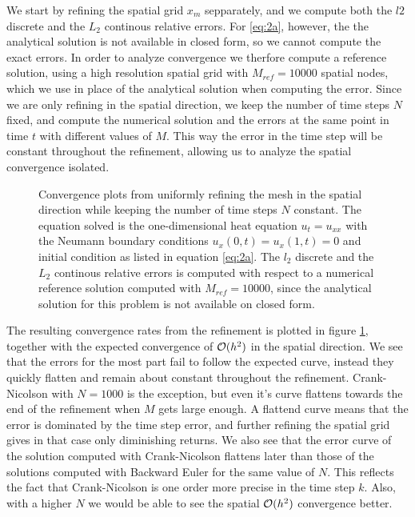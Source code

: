 We start by refining the spatial grid $x_m$ sepparately, 
and we compute both the $l2$ discrete and the $L_2$ continous relative errors. 
For \eqref{eq:2a}, however, the the analytical solution is not available in closed form, 
so we cannot compute the exact errors. 
In order to analyze convergence we therfore compute a reference solution, 
using a high resolution spatial grid with $M_{ref}=10000$ spatial nodes, 
which we use in place of the analytical solution when computing the error. 
Since we are only refining in the spatial direction, 
we keep the number of time steps $N$ fixed, 
and compute the numerical solution and the errors at the same point in time $t$ with different values of $M$. 
This way the error in the time step will be constant throughout the refinement, 
allowing us to analyze the spatial convergence isolated. 
\begin{figure}[ht]
    \centering
    
    \caption{
        Convergence plots from uniformly refining the mesh 
        in the spatial direction while keeping the number of time steps $N$ constant. 
        The equation solved is the one-dimensional heat equation $u_t=u_{xx}$ 
        with the Neumann boundary conditions $u_x(0,t) = u_x(1,t)=0$ and initial condition 
        as listed in equation \eqref{eq:2a}. 
        The $l_2$ discrete and the $L_2$ continous relative errors is computed 
        with respect to a numerical reference solution computed with $M_{ref}=10000$, 
        since the analytical solution for this problem is not available on closed form. 
    }
    \label{fig:2a-convergence}
\end{figure}

The resulting convergence rates from the refinement is plotted in figure \ref{fig:2a-convergence}, 
together with the expected convergence of $\mathcal{O}(h^2)$ in the spatial direction. 
We see that the errors for the most part fail to follow the expected curve, 
instead they quickly flatten and remain about constant throughout the refinement. 
Crank-Nicolson with $N=1000$ is the exception, 
but even it's curve flattens towards the end of the refinement when $M$ gets large enough. 
A flattend curve means that the error is dominated by the time step error, 
and further refining the spatial grid gives in that case only diminishing returns. 
We also see that the error curve of the solution computed with Crank-Nicolson flattens later than those of the solutions computed with Backward Euler for the same value of $N$. 
This reflects the fact that Crank-Nicolson is one order more precise in the time step $k$. 
Also, 
with a higher $N$ we would be able to see the spatial $\mathcal{O}(h^2)$ convergence better. 

